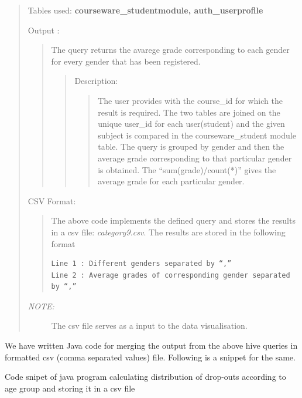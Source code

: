 \documentclass[a4paper,12pt,oneside]{sphinxmanual}
\begin{document}
\begin{itemize}
\begin{quote}
Tables used: \textbf{courseware\_studentmodule, auth\_userprofile}

Output :
\begin{quote}

The query returns the avarege grade corresponding to each gender for every gender that has been registered.
\begin{quote}

Description:
\begin{quote}

The user provides with the course\_id for which the result is required.
The two tables are joined on the unique user\_id for each user(student) and the given subject is compared in the courseware\_student module table.
The query is grouped by gender and then the average grade corresponding to that particular gender is obtained.
The ``sum(grade)/count(*)'' gives the average grade for each particular gender.
\end{quote}
\end{quote}
\end{quote}

CSV Format:
\begin{quote}

The above code implements the defined query and stores the results in a csv file: \emph{category9.csv}.
The results are stored in the following format

\begin{Verbatim}[commandchars=\\\{\}]
Line 1 : Different genders separated by “,”
Line 2 : Average grades of corresponding gender separated by “,”
\end{Verbatim}
\end{quote}
\begin{description}
\item[{\emph{NOTE:}}] \leavevmode
The csv file serves as a input to the data visualisation.

\end{description}
\end{quote}

\end{itemize}

We have written Java code for merging the output from the above hive queries in formatted csv (comma separated values)
file. Following is a snippet for the same.

Code snipet of java program calculating distribution of drop-outs according to age group and storing it in a csv file
\end{document}
